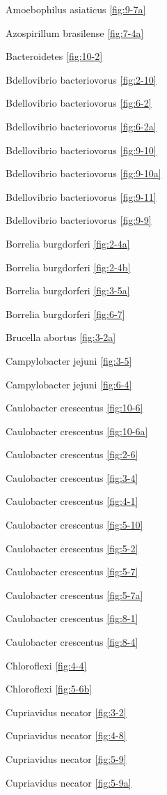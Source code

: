 \documentclass[]{tufte-book}
\begin{document}
Amoebophilus asiaticus \ref{fig:9-7a}

Azospirillum brasilense \ref{fig:7-4a}

Bacteroidetes \ref{fig:10-2}

Bdellovibrio bacteriovorus \ref{fig:2-10}

Bdellovibrio bacteriovorus \ref{fig:6-2}

Bdellovibrio bacteriovorus \ref{fig:6-2a}

Bdellovibrio bacteriovorus \ref{fig:9-10}

Bdellovibrio bacteriovorus \ref{fig:9-10a}

Bdellovibrio bacteriovorus \ref{fig:9-11}

Bdellovibrio bacteriovorus \ref{fig:9-9}

Borrelia burgdorferi \ref{fig:2-4a}

Borrelia burgdorferi \ref{fig:2-4b}

Borrelia burgdorferi \ref{fig:3-5a}

Borrelia burgdorferi \ref{fig:6-7}

Brucella abortus \ref{fig:3-2a}

Campylobacter jejuni \ref{fig:3-5}

Campylobacter jejuni \ref{fig:6-4}

Caulobacter crescentus \ref{fig:10-6}

Caulobacter crescentus \ref{fig:10-6a}

Caulobacter crescentus \ref{fig:2-6}

Caulobacter crescentus \ref{fig:3-4}

Caulobacter crescentus \ref{fig:4-1}

Caulobacter crescentus \ref{fig:5-10}

Caulobacter crescentus \ref{fig:5-2}

Caulobacter crescentus \ref{fig:5-7}

Caulobacter crescentus \ref{fig:5-7a}

Caulobacter crescentus \ref{fig:8-1}

Caulobacter crescentus \ref{fig:8-4}

Chloroflexi \ref{fig:4-4}

Chloroflexi \ref{fig:5-6b}

Cupriavidus necator \ref{fig:3-2}

Cupriavidus necator \ref{fig:4-8}

Cupriavidus necator \ref{fig:5-9}

Cupriavidus necator \ref{fig:5-9a}
\end{document}
